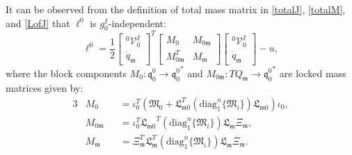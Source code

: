\documentclass[lettersize,journal]{IEEEtran}
\def \q  {\mathfrak{q}}
\def \m  {\mathfrak{m}}
\def \V {\mathcal{V}}
\def \diag {\text{diag}}
\theoremstyle{remark}
\begin{document}
It can be observed from the definition of total mass matrix in \eqref{totalJ}, \eqref{totalM}, and \eqref{LofJ} that $\ell^0$ is $g^I_0$-independent:
\begin{equation}
    \ell^0=\frac{1}{2}\begin{bmatrix}^0\V^I_0 \\ \dot{q}_\mathfrak{m}\end{bmatrix}^T \begin{bmatrix} M_0 & M_{0\mathfrak{m}} \\ M_{0\mathfrak{m}}^T & M_\mathfrak{m} \end{bmatrix} \begin{bmatrix}^0\V^I_0\\\dot{q}_\mathfrak{m}\end{bmatrix}-u,
    \label{l0}
\end{equation}
where the block components $M_0\colon \q^0_0\rightarrow {\q^0_0}^*$ and $M_{0\m}\colon TQ_\m\rightarrow {\q^0_0}^*$ are locked mass matrices\cite{chhabra2015symplectic} given by:
\begin{alignat}{3}
  &M_0&&=\iota_0^T(\mathfrak{M}_0+\mathfrak{L}_{\mathfrak{m}0}^T (\diag^n_1\{\mathfrak{M}_i\})\mathfrak{L}_{\mathfrak{m}0})\iota_0,\\%
  &M_{0\m}&&=\iota_0^T{\mathfrak{L}_{\mathfrak{m}0}}^T (\diag^n_1\{\mathfrak{M}_i\}) \mathfrak{L}_\mathfrak{m} \Xi_\mathfrak{m},\\
  &M_{\mathfrak{m}}&&=\Xi_\mathfrak{m}^T\mathfrak{L}_{\m} ^T (\diag^n_1\{\mathfrak{M}_i\}) \mathfrak{L}_\mathfrak{m}\Xi_\mathfrak{m}.
\end{alignat}
\end{document}
